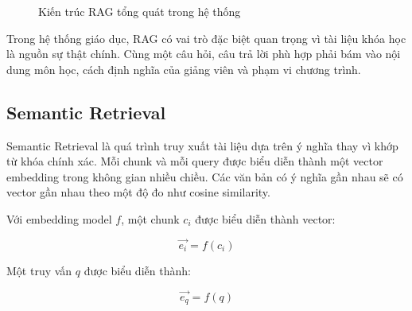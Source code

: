 \begin{figure}[H]
    \centering
    \caption{Kiến trúc RAG tổng quát trong hệ thống}
    \label{fig:rag-architecture}
\end{figure}

Trong hệ thống giáo dục, RAG có vai trò đặc biệt quan trọng vì tài liệu khóa
học là nguồn sự thật chính. Cùng một câu hỏi, câu trả lời phù hợp phải bám vào
nội dung môn học, cách định nghĩa của giảng viên và phạm vi chương trình.

\subsection{Semantic Retrieval}
\label{subsec:semantic-retrieval}

Semantic Retrieval là quá trình truy xuất tài liệu dựa trên ý nghĩa thay vì
khớp từ khóa chính xác. Mỗi chunk và mỗi query được biểu diễn thành một vector
embedding trong không gian nhiều chiều. Các văn bản có ý nghĩa gần nhau sẽ có
vector gần nhau theo một độ đo như cosine similarity.

Với embedding model \(f\), một chunk \(c_i\) được biểu diễn thành vector:

\[
    \vec{e_i} = f(c_i)
\]

Một truy vấn \(q\) được biểu diễn thành:

\[
    \vec{e_q} = f(q)
\]

